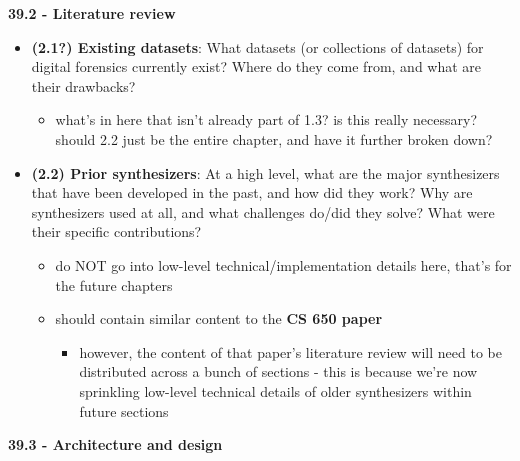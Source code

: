 \textbf{39.2 - Literature review}

\begin{itemize}
\tightlist
\item
  \textbf{(2.1?) Existing datasets}: What datasets (or collections of
  datasets) for digital forensics currently exist? Where do they come
  from, and what are their drawbacks?

  \begin{itemize}
  \tightlist
  \item
    what's in here that isn't already part of 1.3? is this really
    necessary? should 2.2 just be the entire chapter, and have it
    further broken down?
  \end{itemize}
\item
  \textbf{(2.2) Prior synthesizers}: At a high level, what are the major
  synthesizers that have been developed in the past, and how did they
  work? Why are synthesizers used at all, and what challenges do/did
  they solve? What were their specific contributions?

  \begin{itemize}
  \tightlist
  \item
    do NOT go into low-level technical/implementation details here,
    that's for the future chapters
  \item
    should contain similar content to the \textbf{CS 650 paper}

    \begin{itemize}
    \tightlist
    \item
      however, the content of that paper's literature review will need
      to be distributed across a bunch of sections - this is because
      we're now sprinkling low-level technical details of older
      synthesizers within future sections
    \end{itemize}
  \end{itemize}
\end{itemize}

\textbf{39.3 - Architecture and design}

